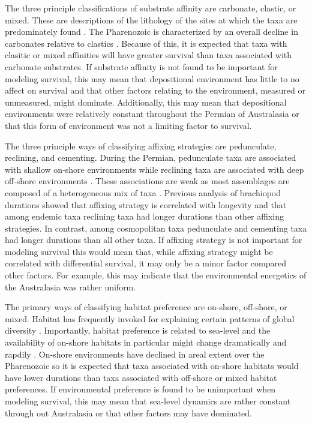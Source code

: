 \documentclass[12pt,letterpaper]{article}
\begin{document}
The three principle classifications of substrate affinity are carbonate, clastic, or mixed. These are descriptions of the lithology of the sites at which the taxa are predominately found \citep{Foote2006,Anderson2011a,Nurnberg2013a,Kiessling2007a,Miller2001}. The Pharenozoic is characterized by an overall decline in carbonates relative to clastics \citep{Foote2006,Miller2001}. Because of this, it is expected that taxa with clasitic or mixed affinities will have greater survival than taxa associated with carbonate substrates. If substrate affinity is not found to be important for modeling survival, this may mean that depositional environment has little to no affect on survival and that other factors relating to the environment, measured or unmeasured, might dominate. Additionally, this may mean that depositional environments were relatively constant throughout the Permian of Australasia or that this form of environment was not a limiting factor to survival.

The three principle ways of classifying affixing strategies are pedunculate, reclining, and cementing. During the Permian, pedunculate taxa are associated with shallow on-shore environments while reclining taxa are associated with deep off-shore environments \citep{Clapham2007}. These associations are weak as most assemblages are composed of a heterogeneous mix of taxa \citep{Clapham2007}. Previous analysis of brachiopod durations showed that affixing strategy is correlated with longevity \citep{Alexander1977} and that among endemic taxa reclining taxa had longer durations than other affixing strategies. In contrast, among cosmopolitan taxa pedunculate and cementing taxa had longer durations than all other taxa. If affixing strategy is not important for modeling survival this would mean that, while affixing strategy might be correlated with differential survival, it may only be a minor factor compared other factors. For example, this may indicate that the environmental energetics of the Australasia was rather uniform. 

The primary ways of classifying habitat preference are on-shore, off-shore, or mixed. Habitat has frequently invoked for explaining certain patterns of global diversity \citep{Sepkoski1991,Kiessling2007a,Bottjer1988,Jablonski1991,Jablonski1983b}. Importantly, habitat preference is related to sea-level and the availability of on-shore habitats in particular might change dramatically and rapdily \citep{Olszewski2004}. On-shore environments have declined in areal extent over the Pharenozoic \citep{Peters2008} so it is expected that taxa associated with on-shore habitats would have lower durations than taxa associated with off-shore or mixed habitat preferences. If environmental preference is found to be unimportant when modeling survival, this may mean that sea-level dynamics are rather constant through out Australasia or that other factors may have dominated.
\end{document}
